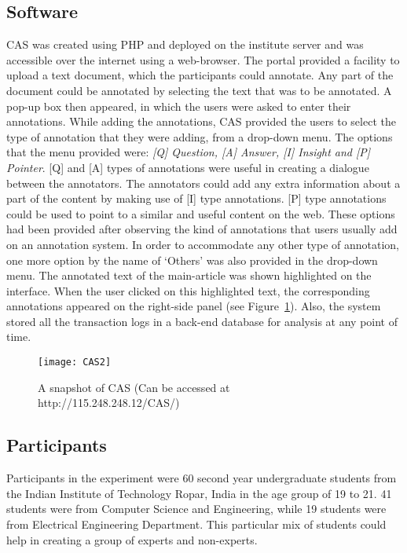 \documentclass{llncs}
\begin{document}
\subsection{Software}
CAS was created using PHP and deployed on the institute server and was accessible over the internet using a web-browser. The portal provided a facility to upload a text document, which the participants could annotate. Any part of the document could be annotated by selecting the text that was to be annotated. A pop-up box then appeared, in which the users were asked to enter their annotations. While adding the annotations, CAS provided the users to select the type of annotation that they were adding, from a drop-down menu. The options that the menu provided were: \textit{[Q] Question, [A] Answer, [I] Insight and [P] Pointer}. [Q] and [A] types of annotations were useful in creating a dialogue between the annotators. The annotators could add any extra information about a part of the content by making use of [I] type annotations. [P] type annotations could be used to point to a similar and useful content on the web. These options had been provided after observing the kind of annotations that users usually add on an annotation system. In order to accommodate any other type of annotation, one more option by the name of ‘Others’ was also provided in the drop-down menu. The annotated text of the main-article was shown highlighted on the interface. When the user clicked on this highlighted text, the corresponding annotations appeared on the right-side panel (see Figure~\ref{fig:CAS}). Also, the system stored all the transaction logs in a back-end database for analysis at any point of time.
\begin{figure}
\centering
\texttt{[image: CAS2]}
\caption{A snapshot of CAS (Can be accessed at http://115.248.248.12/CAS/)}
\label{fig:CAS}
\end{figure}
 
\subsection{Participants}
Participants in the experiment were 60 second year undergraduate students from the Indian Institute of Technology Ropar, India in the age group of 19 to 21. 41 students were from Computer Science and Engineering, while 19 students were from Electrical Engineering Department. This particular mix of students could help in creating a group of experts and non-experts.
\end{document}
